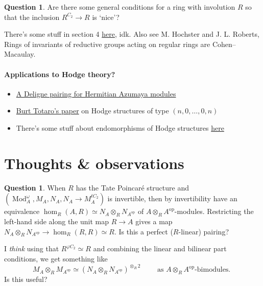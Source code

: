 \documentclass{article}
\DeclareMathOperator{\Mod}{Mod} %
\newcommand{\op}{\mathrm{op}}
\theoremstyle{definition}
\newtheorem{question}[equation]{Question}
\begin{document}
\begin{question}
    Are there some general conditions for a ring with involution $ R $ so that the inclusion $ R^{C_2} \to R $ is `nice'?

    There's some stuff in section 4 \href{https://www.math.nagoya-u.ac.jp/~hasimoto/paper/knop2.pdf}{here}, idk. 
    Also see M. Hochster and J. L. Roberts, Rings of invariants of reductive groups acting on regular rings are Cohen–Macaulay. 
\end{question}

\paragraph{Applications to Hodge theory?} 
\begin{itemize}
    \item \href{https://arxiv.org/abs/1501.05294}{A Deligne pairing for Hermitian Azumaya modules}
    \item \href{https://www.math.ucla.edu/~totaro/papers/public_html/structure.pdf}{Burt Totaro's paper} on Hodge structures of type $ (n,0,\ldots, 0, n) $
    \item There's some stuff about endomorphisms of Hodge structures \href{https://webusers.imj-prg.fr/~claire.voisin/Articlesweb/verbanianotes.pdf}{here}
\end{itemize}

\section{Thoughts \& observations}
\begin{question}
   When $ R $ has the Tate Poincaré structure and $ (\Mod_A^\omega, M_A, N_A, N_A \to M_A^{tC_2}) $ is invertible, then by invertibility have an equivalence $ \hom_R(A, R)\simeq N_A\otimes_R N_{A^\op} $ of $ A \otimes_R A^\op $-modules. 
   Restricting the left-hand side along the unit map $ R \to A $ gives a map $ N_A \otimes_R N_{A^\op} \to \hom_R(R,R) \simeq R $. 
   Is this a perfect ($R$-linear) pairing? 

   I \emph{think} using that $ R^{\varphi C_2} \simeq R $ and combining the linear and bilinear part conditions, we get something like
   \begin{equation*}
       M_A \otimes_R M_{A^\op} \simeq (N_A \otimes_R N_{A^\op})^{\otimes_R 2} \qquad \text{ as $A \otimes_R A^\op$-bimodules. }
   \end{equation*}
   Is this useful?
\end{question}
\end{document}
